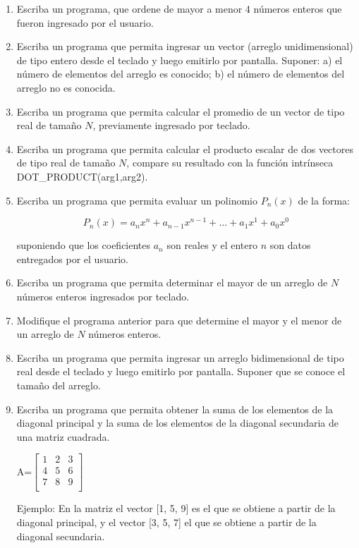 \documentclass[11pt]{exam}
\begin{document}
\begin{enumerate}
\item 
Escriba un programa, que ordene de mayor a menor 4 n\'umeros enteros que fueron  ingresado por el usuario.
\item 
Escriba un programa que permita ingresar un vector (arreglo unidimensional) de tipo entero desde el teclado y luego emitirlo por pantalla. Suponer: a) el n\'umero de elementos del arreglo es conocido; b) el n\'umero de elementos del arreglo no es conocida.  
\item 
Escriba un programa que permita calcular el promedio de un vector de tipo real de tama\~no $N$, previamente ingresado por teclado. 
\item 
Escriba un programa que permita calcular el producto escalar de dos vectores de tipo real de tama\~no $N$, compare su resultado con la funci\'on intr\'inseca  DOT\_PRODUCT(arg1,arg2).
\item     
Escriba un programa que permita evaluar un polinomio $P_{n}(x)$ de la forma:

$$ P_{n}(x)=a_{n}x^{n}+a_{n-1}x^{n-1}+\ldots+a_{1}x^{1}+a_{0}x^{0}$$

suponiendo que los coeficientes $a_{n}$ son reales y  el entero $n$ son datos entregados por el usuario.
\item 
Escriba un programa  que permita determinar el mayor de un arreglo de $N$ n\'umeros enteros ingresados por teclado.
\item 
Modifique el programa anterior para que determine el mayor y el menor de un arreglo de $N$ n\'umeros enteros.
\item 
Escriba un programa  que permita ingresar un arreglo bidimensional de tipo real desde el teclado y luego emitirlo por pantalla. Suponer que se conoce el tama\~no del arreglo.

\item 
Escriba un programa que permita obtener la suma de los elementos de la diagonal principal y la suma de los elementos de la diagonal secundaria de una matriz cuadrada. 
\par
A=$\begin{bmatrix}
 1&2&3\\
4&5&6\\
7&8&9\\
\end{bmatrix}$
\par
Ejemplo: En la matriz el vector [1, 5, 9] es el que se obtiene a partir de la diagonal principal, y el vector [3, 5, 7] el que se obtiene a partir de la diagonal secundaria. 


\end{enumerate}
\end{document}

